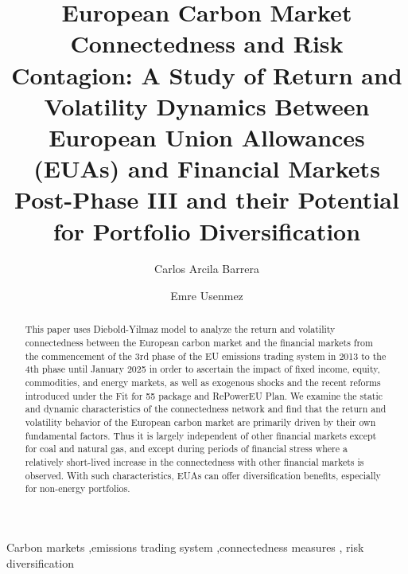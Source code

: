 \documentclass[preprint, 3p,
authoryear]{elsarticle} %
\begin{document}
\begin{frontmatter}

  \title{European Carbon Market Connectedness and Risk Contagion: A
Study of Return and Volatility Dynamics Between European Union
Allowances (EUAs) and Financial Markets Post-Phase III and their
Potential for Portfolio Diversification}
    \author[CISL,Sigma]{Carlos Arcila Barrera%
  }
    \author[Caius]{Emre Usenmez%
  }
  
  \begin{abstract}
  This paper uses Diebold-Yilmaz model to analyze the return and
  volatility connectedness between the European carbon market and the
  financial markets from the commencement of the 3rd phase of the EU
  emissions trading system in 2013 to the 4th phase until January 2025
  in order to ascertain the impact of fixed income, equity, commodities,
  and energy markets, as well as exogenous shocks and the recent reforms
  introduced under the Fit for 55 package and RePowerEU Plan. We examine
  the static and dynamic characteristics of the connectedness network
  and find that the return and volatility behavior of the European
  carbon market are primarily driven by their own fundamental factors.
  Thus it is largely independent of other financial markets except for
  coal and natural gas, and except during periods of financial stress
  where a relatively short-lived increase in the connectedness with
  other financial markets is observed. With such characteristics, EUAs
  can offer diversification benefits, especially for non-energy
  portfolios.
  \end{abstract}
    \begin{keyword}
    Carbon markets \sep emissions trading system \sep connectedness
measures \sep 
    risk diversification
  \end{keyword}
  
 \end{frontmatter}




\end{document}
